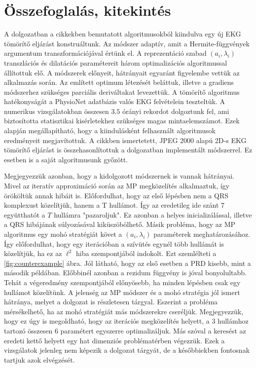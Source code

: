 \documentclass[oneside,titlepage,12pt,a4paper]{report}
\begin{document}
\chapter{Összefoglalás, kitekintés}
A dolgozatban a \cite{hexp3, hexp5} cikkekben bemutatott algoritmusokból kiindulva egy új EKG tömörítő eljárást konstruáltunk. Az módszer adaptív, amit a Hermite-függvények argumentum transzformációjával értünk el. A reprezentáció szabad $(a_i,\lambda_i)$ transzlációs és dilatációs paramétereit három optimalizációs algoritmussal állítottuk elő. A módszerek előnyeit, hátrányait egyaránt figyelembe vettük az alkalmazás során. Az említett optimum létezését beláttuk, illetve a gradiens módszerhez szükséges parciális deriváltakat levezettük. A tömörítő algoritmus hatékonyságát a PhysioNet adatbázis valós EKG felvételein teszteltük. A numerikus vizsgálatokban összesen $3.5$ órányi rekordot dolgoztunk fel, ami biztosította statisztikai kisérletekhez szükséges magas mintaelemszámot. Ezek alapján megállapítható, hogy a kiindulásként felhasznált \cite{hexp3, hexp5} algoritmusok eredményeit megjavítottuk. A \cite{jpeg2000ECG} cikkben ismertetett, JPEG 2000 alapú 2D-s EKG tömörítő eljárást is összehasonlítottuk a dolgozatban implementált módszerrel. Ez esetben is a saját algoritmusunk győzött.

Megjegyezzük azonban, hogy a kidolgozott módszernek is vannak hátrányai. Mivel az iteratív approximáció során az MP megközelítés alkalmaztuk, így örököltük annak hibáit is. Előfordulhat, hogy az első lépésben nem a QRS komplexust közelítjük, hanem a T hullámot. Így az eredetileg ide szánt $7$ együtthatót a $T$ hullámra "pazaroljuk". Ez azonban a helyes inicializálással, illetve a QRS hibájának súlyozásával kiküszöbölhető. Másik probléma, hogy az MP algoritmus egy mohó stratégiát követ a $(a_i,\lambda_i)$ paraméterek meghatározásához. Így előfordulhat, hogy egy iterációban a szívütés egynél több hullámát is közelítjük, ha ez az $\ell^2$ hiba szempontjából indokolt. Ezt szemlélteti a \ref{fig:counterexample} ábra. Jól látható, hogy az első esetben a PRD kisebb, mint a második példában. Előbbinél azonban a rezidum függvény is jóval bonyolultabb. Tehát a végeredmény szempontjából előnyösebb, ha minden lépésben csak egy hullámot közelítünk. A jelenség az MP módszer és a mohó stratégia jól ismert hátránya, melyet a \cite{bpurs} dolgozat is részletesen tárgyal. Eszerint a probléma mérsékelhető, ha az mohó stratégiát más módszerekre cseréljük. Megjegyezzük, hogy ez úgy is megoldható, hogy az iterációs megközelítés helyett, a $3$ hullámhoz tartozó összesen $6$ paramétert egyszerre optimalizáljuk. Más szóval a keresést az eredeti kettő helyett egy hat dimenziós problématérben végezzük. Ezek a vizsgálatok jelenleg nem képezik a dolgozat tárgyát, de a későbbiekben fontosnak tartjuk azok elvégzését.
 
\end{document}
